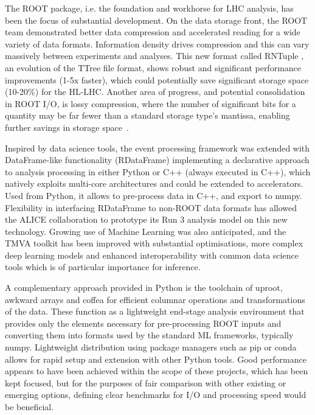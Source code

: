 \documentclass[11pt,a4paper]{article}
\begin{document}
The ROOT package, i.e. the foundation and workhorse for LHC analysis,
has been the focus of substantial development. On the data storage
front, the ROOT team demonstrated better data compression and
accelerated reading for a wide variety of data formats. Information
density drives compression and this can vary massively between
experiments and analyses. This new format called RNTuple \cite{Ref9, ROOT-2020-HL-LHC}, an
evolution of the TTree file format, shows robust and significant
performance improvements (1-5x faster), which could potentially save
significant storage space (10-20\%) for the HL-LHC. Another area of
progress, and potential consolidation in ROOT I/O, is lossy compression,
where the number of significant bits for a quantity may be far fewer
than a standard storage type's mantissa, enabling further savings in
storage space~\cite{ROOT-2020-HL-LHC}.

Inspired by data science tools, the event processing framework was
extended with DataFrame-like functionality (RDataFrame) implementing a
declarative approach to analysis processing in either Python or C++
(always executed in C++), which natively exploits multi-core
architectures \cite{Ref7} and could be extended to accelerators. Used from
Python, it allows to pre-process data in C++, and export to numpy.
Flexibility in interfacing RDataFrame to non-ROOT data formats has
allowed the ALICE collaboration to prototype its Run 3 analysis model on
this new technology. Growing use of Machine Learning was also
anticipated, and the TMVA toolkit has been improved with substantial
optimisations, more complex deep learning models and enhanced
interoperability with common data science tools \cite{Ref14,Ref15}  which is of
particular importance for inference.

A complementary approach provided in Python is the toolchain of uproot,
awkward arrays and coffea \cite{Ref8} for efficient columnar operations and
transformations of the data. These function as a lightweight end-stage
analysis environment that provides only the elements necessary for
pre-processing ROOT inputs and converting them into formats used by the
standard ML frameworks, typically numpy. Lightweight distribution using
package managers such as pip or conda allows for rapid setup and
extension with other Python tools. Good performance appears to have been
achieved within the scope of these projects, which has been kept
focused, but for the purposes of fair comparison with other existing or
emerging options, defining clear benchmarks for I/O and processing speed
would be beneficial.
\end{document}

